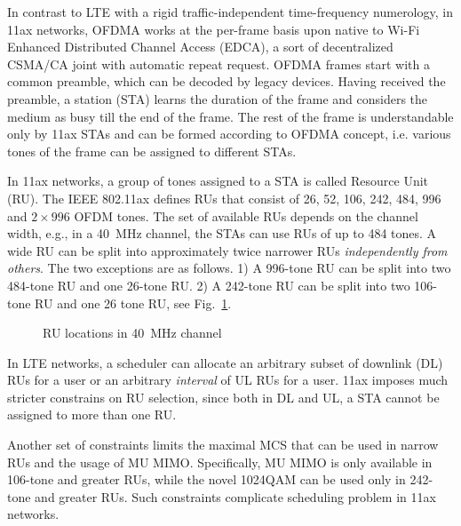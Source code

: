 


In contrast to LTE with a rigid traffic-independent time-frequency numerology, in 11ax networks, OFDMA works at the per-frame basis upon native to Wi-Fi Enhanced Distributed Channel Access (EDCA), a sort of decentralized CSMA/CA joint with automatic repeat request.
OFDMA frames start with a common preamble, which can be decoded by legacy devices.
Having received the preamble, a station (STA) learns the duration of the frame and considers the medium as busy till the end of the frame.
The rest of the frame is understandable only by 11ax STAs and can be formed according to OFDMA concept, i.e. various tones of the frame can be assigned to different STAs. 

In 11ax networks, a group of tones assigned to a STA is called Resource Unit (RU).
The IEEE 802.11ax defines RUs that consist of 26, 52, 106, 242, 484, 996 and $2\times996$ OFDM tones.
The set of available RUs depends on the channel width, e.g., in a \SI{40}{\MHz} channel, the STAs can use RUs of up to 484 tones.
A wide RU can be split into approximately twice narrower RUs \textit{independently from others}. The two exceptions are as follows.
1) A 996-tone RU can be split into two 484-tone RU and one 26-tone RU.
2) A 242-tone RU can be split into two 106-tone RU and one 26 tone RU, see Fig.~\ref{fig:resource_units}.

\begin{figure}[tb]
	\centering
	
	\caption{\label{fig:resource_units} RU locations in \SI{40}{\MHz} channel}
\vspace{-0.5em}
\end{figure}

In LTE networks, a scheduler can allocate an arbitrary subset of downlink (DL) RUs for a user or an arbitrary \emph{interval} of UL RUs for a user.
11ax imposes much stricter constrains on RU selection, since both in DL and UL, a STA cannot be assigned to more than one RU.

Another set of constraints limits the maximal MCS that can be used in narrow RUs and the usage of MU MIMO.
Specifically, MU MIMO is only available in 106-tone and greater RUs, while the novel 1024QAM can be used only in 242-tone and greater RUs.
Such constraints complicate scheduling problem in 11ax networks.

